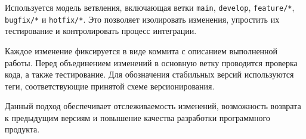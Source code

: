 \documentclass[14pt,a4paper]{extarticle}
\begin{document}
Используется модель ветвления, включающая ветки \texttt{main}, \texttt{develop}, \texttt{feature/*}, \texttt{bugfix/*} и \texttt{hotfix/*}. Это позволяет изолировать изменения, упростить их тестирование и контролировать процесс интеграции.

Каждое изменение фиксируется в виде коммита с описанием выполненной работы. Перед объединением изменений в основную ветку проводится проверка кода, а также тестирование. Для обозначения стабильных версий используются теги, соответствующие принятой схеме версионирования.

Данный подход обеспечивает отслеживаемость изменений, возможность возврата к предыдущим версиям и повышение качества разработки программного продукта.
\end{document}
